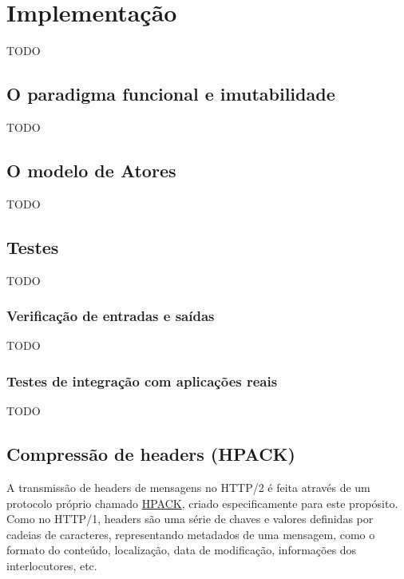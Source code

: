 \documentclass[12pt,a4paper,openright,twoside,english,brazil,]{abntex2}	%
\begin{document}
\section{Implementação}\label{implementauxe7uxe3o}

TODO

\subsection{O paradigma funcional e
imutabilidade}\label{o-paradigma-funcional-e-imutabilidade}

TODO

\subsection{O modelo de Atores}\label{o-modelo-de-atores}

TODO

\subsection{Testes}\label{testes}

TODO

\subsubsection{Verificação de entradas e
saídas}\label{verificauxe7uxe3o-de-entradas-e-sauxeddas}

TODO

\subsubsection{Testes de integração com aplicações
reais}\label{testes-de-integrauxe7uxe3o-com-aplicauxe7uxf5es-reais}

TODO

\subsection{Compressão de headers
(HPACK)}\label{compressuxe3o-de-headers-hpack}

A transmissão de headers de mensagens no HTTP/2 é feita através de um
protocolo próprio chamado \href{}{HPACK}, criado especificamente para
este propósito. Como no HTTP/1, headers são uma série de chaves e
valores definidas por cadeias de caracteres, representando metadados de
uma mensagem, como o formato do conteúdo, localização, data de
modificação, informações dos interlocutores, etc.
\end{document}

